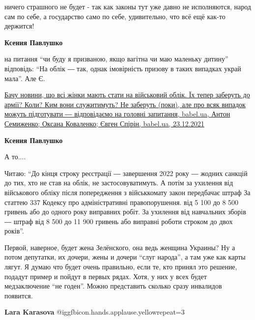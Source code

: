 \begin{itemize}

ничего страшного не будет - так как законы тут уже давно не исполняются, народ
сам по себе, а государство само по себе, удивительно, что всё ещё как-то
держится!

\begin{itemize} %
\textbf{Ксения Павлушко} 

на питання \enquote{чи буду я призваною, якщо вагітна чи маю маленьку дитину}
відповідь: \enquote{На облік ― так, однак імовірність призову в таких випадках украй
мала}. Але Є.

\href{https://babel.ua/texts/74560-bachu-novini-shcho-vsi-zhinki-mayut-stati-na-viyskoviy-oblik-jih-teper-zaberut-do-armiji-koli-kim-voni-sluzhitimut-ne-zaberut-poki-ale-pro-vsyak-vipadok-mozhut-pidgotuvati-vidpovidayemo-na-golovni-zap}{%
Бачу новини, що всі жінки мають стати на військовий облік. Їх тепер заберуть до армії? Коли? Ким вони служитимуть? Не заберуть (поки), але про всяк випадок можуть підготувати ― відповідаємо на головні запитання, babel.ua, %
Антон Семиженко; Оксана Коваленко; Євген Спірін, babel.ua, 23.12.2021%
}

\textbf{Ксения Павлушко} 

А то.... 

Читаю: \enquote{До кінця строку реєстрації ― завершення 2022 року ― жодних
санкцій до тих, хто не став на облік, не застосовуватимуть. А потім за ухилення
від військового обліку після попередження з військкомату закон передбачає штраф
За статтею 337 Кодексу про адміністративні правопорушення.
від 5 100 до 8 500 гривень або до одного року виправних робіт. За ухилення від
навчальних зборів ― штраф від 8 500 до 11 900 гривень або виправні роботи
строком до двох років}.

\end{itemize} %


Первой, наверное, будет жена Зелёнского, она ведь женщина Украины? Ну а потом
депутатки, их дочери, жены и дочери \enquote{слуг народа}, а там уже как карты лягут.
Я думаю что будет очень правильно, если те, кто принял это решение, подадут
пример и пойдут в первых рядах. Хотя, у них у всех будет медзаключение \enquote{не
годен}. Можно представить сколько сразу инвалидов появится.

\textbf{Lara Karasova}  @igg{fbicon.hands.applause.yellow}{repeat=3} 




\end{itemize}
